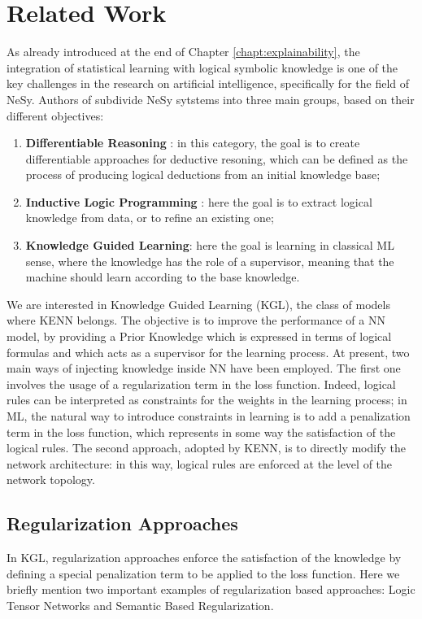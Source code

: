  
 \section{Related Work}
 As already introduced at the end of Chapter \ref{chapt:explainability}, the integration of statistical learning with logical symbolic knowledge is one of the key challenges in the research on artificial intelligence, specifically for the field of NeSy. Authors of \cite{daniele2019kenn} subdivide NeSy sytstems into three main groups, based on their different objectives:
 \begin{enumerate}
 	\item \textbf{Differentiable Reasoning }: \textcolor{unipd}{in this category, the goal is to create differentiable approaches for deductive resoning, which can be defined as the process of producing logical deductions from an initial knowledge base;}
 	\item \textbf{Inductive Logic Programming} : here the goal is to extract logical knowledge from data, or to refine an existing one;
 	\item \textbf{Knowledge Guided Learning}: here the goal is learning in classical ML sense, where the knowledge has the role of a supervisor, meaning that the machine should learn according to the base knowledge.
 \end{enumerate}

 We are interested in Knowledge Guided Learning (KGL), the class of models where KENN belongs. The objective is to improve the performance of a NN model, by providing a Prior Knowledge which is expressed in terms of logical formulas and which acts as a supervisor for the learning process. At present, two main ways of injecting knowledge inside NN have been employed. The first one involves the usage of a regularization term in the loss function. Indeed, logical rules can be interpreted as constraints for the weights in the learning process; in ML, the natural way to introduce constraints in learning is to add a penalization term in the loss function, which represents in some way the satisfaction of the logical rules. The second approach, adopted by KENN, is to directly modify the network architecture: in this way, logical rules are enforced at the level of the network topology.
 
 \subsection{Regularization Approaches}
In KGL, regularization approaches enforce the satisfaction of the knowledge by defining a special penalization term to be applied to the loss function. Here we briefly mention two important examples of regularization based approaches: Logic Tensor Networks and Semantic Based Regularization.
 
